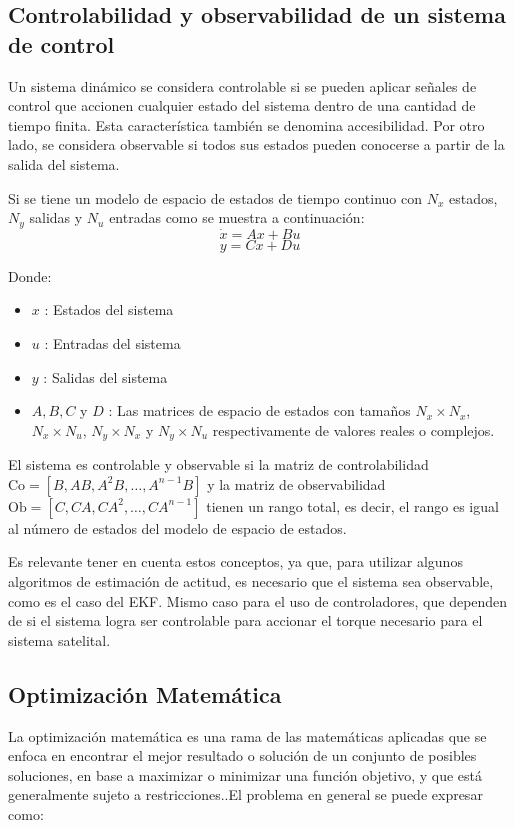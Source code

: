 \subsection{Controlabilidad y observabilidad de un sistema de control}

Un sistema dinámico se considera controlable si se pueden aplicar señales de control que accionen cualquier estado del sistema dentro de una cantidad de tiempo finita. Esta característica también se denomina accesibilidad. Por otro lado, se considera observable si todos sus estados pueden conocerse a partir de la salida del sistema.

Si se tiene un modelo de espacio de estados de tiempo continuo con \( N_x \) estados, \( N_y \) salidas y \( N_u \) entradas como se muestra a continuación:
\[
	\dot{x} = Ax + Bu
\]
\[
	y = Cx + Du
\]

Donde:
\begin{itemize}
	\item \( x \) : Estados del sistema
	\item \( u \) : Entradas del sistema
	\item \( y \) : Salidas del sistema
	\item \( A, B, C \) y \( D \) : Las matrices de espacio de estados con tamaños \( N_x \times N_x \), \( N_x \times N_u \), \( N_y \times N_x \) y \( N_y \times N_u \) respectivamente de valores reales o complejos.
\end{itemize}

El sistema es controlable y observable si la matriz de controlabilidad $\text{Co} = [B, AB, A^2B, \ldots, A^{n-1}B]$ y la matriz de observabilidad $\text{Ob} = [C, CA, CA^2, \ldots, CA^{n-1}]$ tienen un rango total, es decir, el rango es igual al número de estados del modelo de espacio de estados.

Es relevante tener en cuenta estos conceptos, ya que, para utilizar algunos algoritmos de estimación de actitud, es necesario que el sistema sea observable, como es el caso del \gls{EKF}. Mismo caso para el uso de controladores, que dependen de si el sistema logra ser controlable para accionar el torque necesario para el sistema satelital.

\subsection{Optimización Matemática}

La optimización matemática es una rama de las matemáticas aplicadas que se enfoca en encontrar el mejor resultado o solución de un conjunto de posibles soluciones, en base a maximizar o minimizar una función objetivo, y que está generalmente sujeto a restricciones.\cite{ref30}.El problema en general se puede expresar como:

